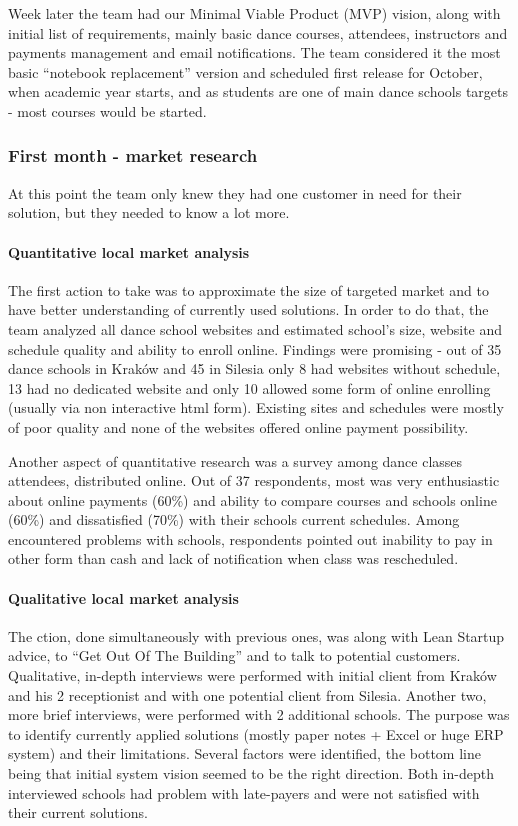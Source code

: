 \documentclass{article}
\begin{document}
Week later the team had our Minimal Viable Product (MVP) vision, along with initial list of requirements, mainly basic dance courses, attendees, instructors and payments management and email notifications. The team considered it the most basic ``notebook replacement'' version and scheduled first release for October, when academic year starts, and as students are one of main dance schools targets - most courses would be started.

\subsubsection{First month - market research}
At this point the team only knew they had one customer in need for their solution, but they needed to know a lot more.

\paragraph{Quantitative local market analysis}
The first action to take was to approximate the size of targeted market and to have better understanding of currently used solutions. In order to do that, the team analyzed all dance school websites and estimated school's size, website and schedule quality and ability to enroll online. Findings were promising - out of 35 dance schools in Kraków and 45 in Silesia only 8 had websites without schedule, 13 had no dedicated website and only 10 allowed some form of online enrolling (usually via non interactive html form). Existing sites and schedules were mostly of poor quality and none of the websites offered online payment possibility.

Another aspect of quantitative research was a survey among dance classes attendees, distributed online. Out of 37 respondents, most was very enthusiastic about online payments (60\%) and ability to compare courses and schools online (60\%) and dissatisfied (70\%) with their schools current schedules. Among encountered problems with schools, respondents pointed out inability to pay in other form than cash and lack of notification when class was rescheduled.

\paragraph{Qualitative local market analysis}
The ction, done simultaneously with previous ones, was along with Lean Startup advice, to ``Get Out Of The Building'' and to talk to potential customers. Qualitative, in-depth interviews were performed with initial client from Kraków and his 2 receptionist and with one potential client from Silesia. Another two, more brief interviews, were performed with 2 additional schools. The purpose was to identify currently applied solutions (mostly paper notes + Excel or huge ERP system) and their limitations. Several factors were identified, the bottom line being that initial system vision seemed to be the right direction. Both in-depth interviewed schools had problem with late-payers and were not satisfied with their current solutions.
\end{document}
